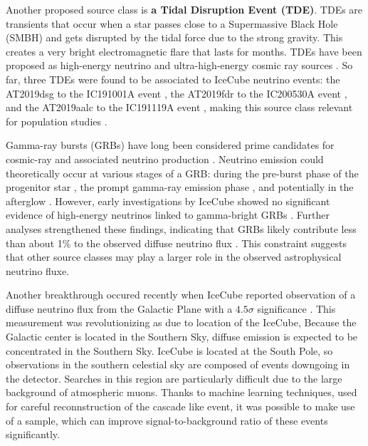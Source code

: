 Another proposed source class is \textbf{a Tidal Disruption Event (TDE)}. TDEs are transients that occur when a star passes close to a Supermassive Black Hole (SMBH) and gets disrupted by the tidal force due to the strong gravity. This creates a very bright electromagnetic flare that lasts for months. TDEs have been proposed as high-energy neutrino and ultra-high-energy cosmic ray sources . So far, three TDEs were found to be associated to IceCube neutrino events: the AT2019dsg to the IC191001A event , the AT2019fdr to the IC200530A event , and the AT2019aalc to the IC191119A event , making this source class relevant for population studies .

Gamma-ray bursts (GRBs) have long been considered prime candidates for cosmic-ray and associated neutrino production . Neutrino emission could theoretically occur at various stages of a GRB: during the pre-burst phase of the progenitor star , the prompt gamma-ray emission phase , and potentially in the afterglow . However, early investigations by IceCube showed no significant evidence of high-energy neutrinos linked to gamma-bright GRBs . Further analyses strengthened these findings, indicating that GRBs likely contribute less than about 1\% to the observed diffuse neutrino flux . This constraint suggests that other source classes may play a larger role in the observed astrophysical neutrino fluxe. 

Another breakthrough occured recently when IceCube reported observation of a diffuse neutrino flux from the Galactic Plane with a $4.5\sigma$ significance . This measurement was revolutionizing as due to location of the IceCube, Because the Galactic center is located in the Southern Sky, diffuse emission is expected to be concentrated in the Southern Sky. IceCube is located at the South Pole, so observations in the southern celestial sky are composed of events downgoing in the detector. Searches in this region are particularly difficult due to the large background of atmospheric muons. Thanks to machine learning techniques, used for careful reconnstruction of the cascade like event, it was possible to make use of a sample, which can improve signal-to-background ratio of these events significantly.


